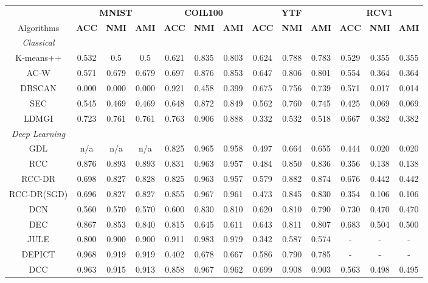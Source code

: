 \begin{tabular}{ccccccccccccc}	
\hline	
& \multicolumn{3}{c}{\textbf{MNIST}  } & \multicolumn{3}{c}{\textbf{COIL100}  } & \multicolumn{3}{c}{\textbf{YTF} } & \multicolumn{3}{c}{\textbf{RCV1}} \\
\cmidrule(r){2-4} \cmidrule(r){5-7} \cmidrule(r){8-10} \cmidrule(r){11-13}
Algorithms	&	\textbf{ACC}	&	\textbf{NMI}	&	\textbf{AMI}	&	\textbf{ACC}	&	\textbf{NMI}	&	\textbf{AMI}	&	\textbf{ACC}	&	\textbf{NMI}	&	\textbf{AMI}	&	\textbf{ACC}	&	\textbf{NMI}	&	\textbf{AMI}	\\	\hline	
\multicolumn{1}{c}{\textit{Classical} } \\ 
K-means++	&	0.532	&	0.5	&	0.5	&	0.621	&	0.835	&	0.803	&	0.624	&	0.788	&	0.783	&	0.529	&	0.355	&	0.355	\\																					
AC-W	&	0.571	&	0.679	&	0.679	&	0.697	&	0.876	&	0.853	&	0.647	&	0.806	&	0.801	&	0.554	&	0.364	&	0.364	\\																					
DBSCAN	&	0.000	&	0.000	&	0.000	&	0.921	&	0.458	&	0.399	&	0.675	&	0.756	&	0.739	&	0.571	&	0.017	&	0.014	\\																					
SEC	&	0.545	&	0.469	&	0.469	&	0.648	&	0.872	&	0.849	&	0.562	&	0.760	&	0.745	&	0.425	&	0.069	&	0.069	\\																					
LDMGI	&	0.723	&	0.761	&	0.761	&	0.763	&	0.906	&	0.888	&	0.332	&	0.532	&	0.518	&	0.667	&	0.382	&	0.382	\\																
\hline
\multicolumn{1}{c}{\textit{Deep Learning} } \\ 

GDL	&	n/a	&	n/a	&	n/a	&	0.825	&	0.965	&	0.958	&	0.497	&	0.664	&	0.655	&	0.444	&	0.020	&	0.020	\\																					
RCC	&	0.876	&	0.893	&	0.893	&	0.831	&	0.963	&	0.957	&	0.484	&	0.850	&	0.836	&	0.356	&	0.138	&	0.138	\\																					
RCC-DR	&	0.698	&	0.827	&	0.828	&	0.825	&	0.963	&	0.957	&	0.579	&	0.882	&	0.874	&	0.676	&	0.442	&	0.442	\\																					
RCC-DR(SGD)	&	0.696	&	0.827	&	0.827	&	0.855	&	0.967	&	0.961	&	0.473	&	0.845	&	0.830	&	0.354	&	0.106	&	0.106	\\																					


DCN	&	0.560	&	0.570	&	0.570	&	0.600	&	0.830	&	0.810	&	0.620	&	0.810	&	0.790	&	0.730	&	0.470	&	0.470	\\																					
DEC	&	0.867	&	0.853	&	0.840	&	0.815	&	0.645	&	0.611	&	0.643	&	0.811	&	0.807	&	0.683	&	0.504	&	0.500	\\																					
JULE	&	0.800	&	0.900	&	0.900	&	0.911	& 0.983	&	0.979	&	0.342	&	0.587	&	0.574	&	-	&	-	&	-	\\																					
DEPICT	& 0.968	&	0.919	&	0.919	&	0.402	&	0.678	&	0.667	&	0.586	&	0.790	&	0.785	&	-	&	-	&	-	\\																					
DCC	&	0.963	&	0.915	&	0.913	&	0.858	&	0.967	&	0.962	&	0.699	&	0.908	& 0.903	&	0.563	& 0.498 &	0.495	\\																					
\hline	




\end{tabular}
